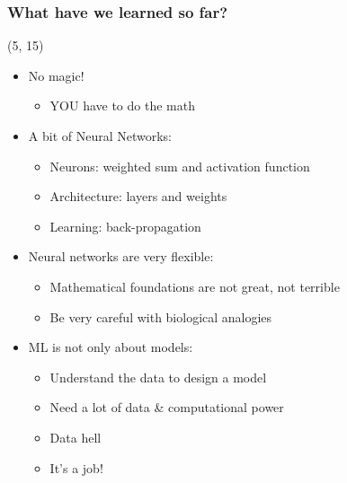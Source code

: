 \begin{frame}
  \frametitle{What have we learned so far?}

  \begin{textblock}{90}(5, 15)
    \begin{itemize}
    \item<1-> No magic!
      \begin{itemize}
      \item YOU have to do the math
      \end{itemize}
    \item<2-> A bit of Neural Networks:
      \begin{itemize}
      \item Neurons: weighted sum and activation function
      \item Architecture: layers and weights
      \item Learning: back-propagation
      \end{itemize}
    \item<3-> Neural networks are very flexible:
      \begin{itemize}
      \item Mathematical foundations are not great, not terrible
      \item Be very careful with biological analogies
      \end{itemize}
    \item<4-> ML is not only about models:
      \begin{itemize}
      \item Understand the data to design a model
      \item Need a lot of data \& computational power
      \item Data hell
      \item It's a job!
      \end{itemize}
    \end{itemize}
  \end{textblock}
\end{frame}
